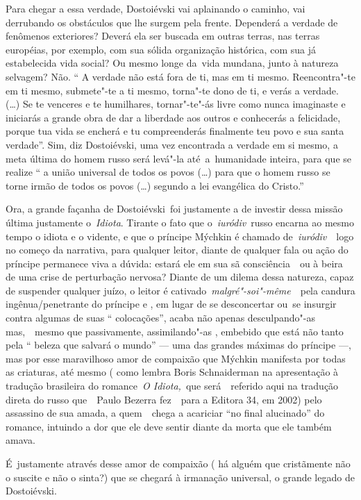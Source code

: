 Para chegar a essa verdade, Dostoiévski vai aplainando o caminho, vai
derrubando os obstáculos que lhe surgem pela frente. Dependerá a verdade
de fenômenos exteriores? Deverá ela ser buscada em outras terras, nas
terras européias, por exemplo, com sua sólida organização histórica, com
sua já estabelecida vida social? Ou mesmo longe da~vida mundana, junto à
natureza selvagem? Não. `` A verdade não está fora de ti, mas em ti
mesmo. Reencontra"-te em ti mesmo, submete"-te a ti mesmo, torna"-te dono
de ti, e verás a verdade. (\ldots{}) Se te venceres e te humilhares,
tornar"-te"-ás livre como nunca imaginaste e iniciarás a grande obra de
dar a liberdade aos outros e conhecerás a felicidade, porque tua vida se
encherá e tu compreenderás finalmente teu povo e sua santa verdade''.
Sim, diz Dostoiévski, uma vez encontrada a verdade em si mesmo, a meta
última do homem russo será levá"-la até~a~humanidade inteira, para que se
realize `` a união universal de todos os povos (\ldots{}) para que o homem
russo se torne irmão de todos os povos (\ldots{}) segundo a lei evangélica do
Cristo.''

Ora, a grande façanha de Dostoiévski~foi justamente a de investir dessa
missão última justamente o~\emph{Idiota}. Tirante o fato que
o\emph{~iuródiv}~russo encarna ao mesmo tempo o idiota e o vidente, e
que o príncipe Mýchkin é chamado de\emph{~iuródiv}~~logo no começo da
narrativa, para qualquer leitor, diante de qualquer fala ou ação do
príncipe permanece viva a dúvida: estará ele em sua sã consciência~~ou à
beira de uma crise de perturbação nervosa? Diante de um dilema dessa
natureza, capaz de suspender qualquer juízo, o leitor é
cativado~\emph{malgré"-soi"-même}~~pela candura ingênua/penetrante do
príncipe e , em lugar de se desconcertar ou~se insurgir contra algumas
de suas `` colocações'', acaba não apenas desculpando"-as mas,~~mesmo que
passivamente, assimilando"-as , embebido que está não tanto pela ``
beleza que salvará o mundo'' --- uma das grandes máximas do príncipe
---, mas por esse maravilhoso amor de compaixão que Mýchkin manifesta
por todas as criaturas, até mesmo ( como lembra Boris Schnaiderman na
apresentação à tradução brasileira do romance~\emph{O Idiota,}~que
será~~referido aqui na tradução direta do russo que~~Paulo Bezerra
fez~~para a Editora 34, em 2002) pelo assassino de sua amada, a
quem~~chega a acariciar ``no final alucinado'' do romance, intuindo a
dor que ele deve sentir diante da morta que ele também amava.

É~justamente através desse amor de compaixão ( há alguém que cristãmente
não o suscite e não o sinta?) que se chegará à irmanação universal, o
grande legado de Dostoiévski.

